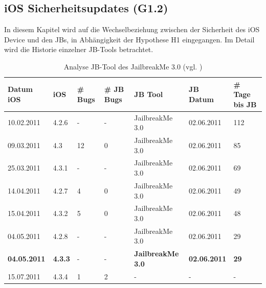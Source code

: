\subsection{iOS Sicherheitsupdates  (G1.2)}
\label{sec:Frage2SecUpdate}

In diesem Kapitel wird auf die Wechselbeziehung zwischen der Sicherheit des iOS Device und den JBs, in Abhängigkeit der Hypothese H1 eingegangen. Im Detail wird die Historie einzelner JB-Tools betrachtet. 

\begin{table}[hp!]
    \begin{center}
        \begin{tabular}{| p{20mm} | p{12mm} | p{17mm} | p{12mm} | p{32mm} | p{22mm} | p{15mm} |} \hline
             \textbf{Datum iOS} & \textbf{iOS} & \textbf{\# Bugs} & \textbf{\# JB Bugs} & \textbf{JB Tool} & \textbf{JB Datum} & \textbf{\# Tage bis JB} \\ \hline 
            10.02.2011 & 4.2.6 &  - & -  & JailbreakMe 3.0 & 02.06.2011 & 112 \\ \hline
             09.03.2011 & 4.3 & 12 & 0 & JailbreakMe 3.0 &	02.06.2011 & 85 \\ \hline
             25.03.2011 & 4.3.1 &  - & - & JailbreakMe 3.0 & 02.06.2011 & 69 \\ \hline
            14.04.2011 & 4.2.7 &  4 & 0 & JailbreakMe 3.0 & 02.06.2011 & 49 \\ \hline
             15.04.2011 & 4.3.2 & 5 & 0 & JailbreakMe 3.0 & 02.06.2011 & 48 \\ \hline
             04.05.2011 & 4.2.8 &  - & - & JailbreakMe 3.0 & 02.06.2011 & 29 \\ \hline
            \textbf{04.05.2011} & \textbf{4.3.3} &  - & -  & \textbf{JailbreakMe 3.0} & \textbf{02.06.2011} & \textbf{29} \\ \hline
            15.07.2011 & 4.3.4 &  1 & 2	 & - & - & - \\ \hline
        \end{tabular} 
        \caption{Analyse JB-Tool des JailbreakMe 3.0 (vgl. \cite{Apple[7]}) \protect\footnotemark }         
        \label{tab:AnalyseJailbreakMe3.0}
    \end{center}
\end{table}

